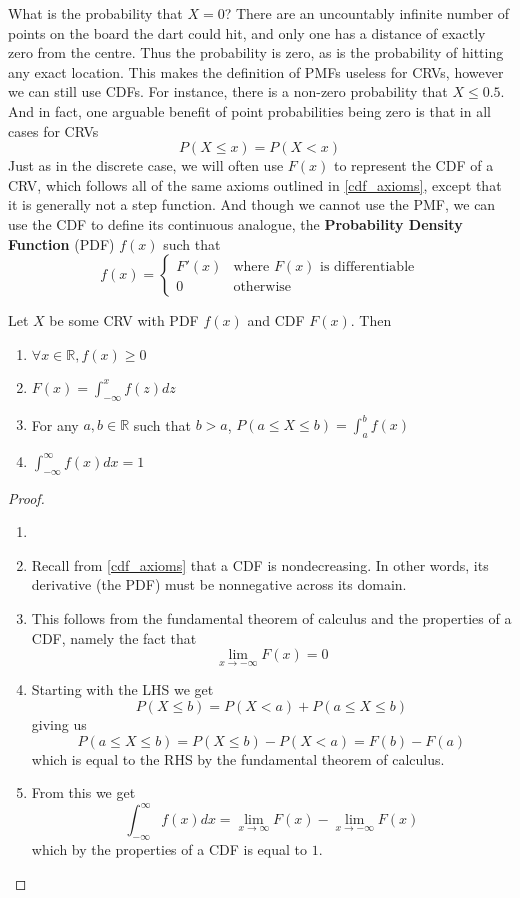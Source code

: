 What is the probability that $X=0$? There are an uncountably infinite number of points on the board the dart could hit, and only one has a distance of exactly zero from the centre. Thus the probability is zero, as is the probability of hitting any exact location. This makes the definition of PMFs useless for CRVs, however we can still use CDFs. For instance, there is a non-zero probability that $X\le 0.5$. And in fact, one arguable benefit of point probabilities being zero is that in all cases for CRVs\[
    P(X\le x)= P(X< x)
\]
Just as in the discrete case, we will often use $F(x)$ to represent the CDF of a CRV, which follows all of the same axioms outlined in \ref{cdf_axioms}, except that it is generally not a step function. And though we cannot use the PMF, we can use the CDF to define its continuous analogue, the \textbf{Probability Density Function} (PDF) $f(x)$ such that
\[
    f(x) = \begin{cases}
        F'(x) & \text{where $F(x)$ is differentiable}
        \\
        0 & \text{otherwise}
    \end{cases}
\]
\begin{theorem}
    Let $X$ be some CRV with PDF $f(x)$ and CDF $F(x)$. Then
    \begin{enumerate}
        \item $\forall x\in\mathbb R, f(x)\ge 0$
        \item $F(x)=\int_{-\infty}^x f(z)dz$
        \item For any $a,b\in\mathbb R$ such that $b>a$, $P(a\le X\le b)=\int_a^b f(x)$
        \item $\int_{-\infty}^\infty f(x)dx = 1$
    \end{enumerate}
    \begin{proof}
        \begin{enumerate}
            \item[]
            \item Recall from \ref{cdf_axioms} that a CDF is nondecreasing. In other words, its derivative (the PDF) must be nonnegative across its domain.
            \item This follows from the fundamental theorem of calculus and the properties of a CDF, namely the fact that
            \[
                \lim_{x\to-\infty} F(x)=0
            \]
            \item Starting with the LHS we get
            \[
                P(X\le b)=P(X< a)+P(a\le X\le b)
            \]
            giving us
            \[
                P(a\le X\le b)=P(X\le b)-P(X<a)=F(b)-F(a)
            \]
            which is equal to the RHS by the fundamental theorem of calculus.
            \item
            From this we get
            \[
                \int_{-\infty}^\infty f(x)dx = \lim_{x\to \infty} F(x) -\lim_{x\to -\infty} F(x)
            \]
            which by the properties of a CDF is equal to $1$.
        \end{enumerate}
    \end{proof}
\end{theorem}

